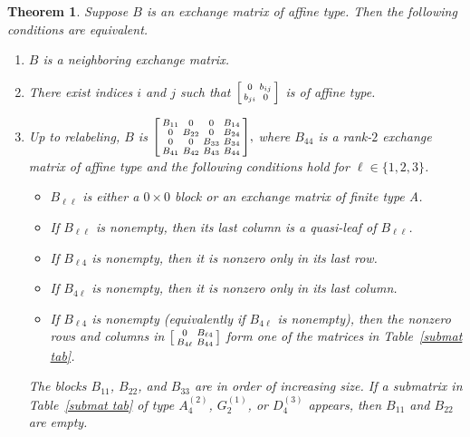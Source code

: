 \documentclass[10pt]{article}
\newtheorem{theorem}[proposition]{Theorem}
\theoremstyle{definition}
\theoremstyle{remark}
\numberwithin{equation}{section}
\newcommand{\set}[1]{{\lbrace #1 \rbrace}}
\newcommand{\0}{{\mathbf{0}}}
\renewcommand{\b}{\mathbf{b}}
\begin{document}
\begin{theorem}\label{neigh B}
Suppose $B$ is an exchange matrix of affine type.
Then the following conditions are equivalent.
\begin{enumerate}[label=\rm(\roman*), ref=(\roman*)]
\item \label{neigh}
$B$ is a neighboring exchange matrix.
\item \label{aff 2}
There exist indices $i$ and $j$ such that $\begin{bsmallmatrix}0&b_{ij}\\b_{ji}&0\end{bsmallmatrix}$ is of affine type.
\item \label{neigh detailed}
Up to relabeling, $B$ is
    $
      \begin{bsmallmatrix}
        B_{11} 	& 0 		& 0 		& B_{14} \\ 
        0 		& B_{22} 	& 0 		& B_{24} \\
        0 		& 0 		& B_{33} 	& B_{34} \\
        B_{41} 	& B_{42} 	& B_{43} 	& B_{44}
      \end{bsmallmatrix},
    $ 
where $B_{44}$ is a rank-$2$ exchange matrix of affine type and the following conditions hold for ${\ell\in\set{1,2,3}}$.
\begin{itemize}
\item
$B_{\ell\ell}$ is either a $0\times0$ block or an exchange matrix of finite type A. %
\item
If $B_{\ell\ell}$ is nonempty, then its last column is a quasi-leaf of $B_{\ell\ell}$.
\item
If $B_{\ell4}$ is nonempty, then it is nonzero only in its last row.
\item
If $B_{4\ell}$ is nonempty, then it is nonzero only in its last column.
\item
If $B_{\ell4}$ is nonempty (equivalently if $B_{4\ell}$ is nonempty), then the nonzero rows and columns in $\begin{bsmallmatrix} 0 & B_{\ell4} \\ B_{4\ell} & B_{44} \end{bsmallmatrix}$ form one of the matrices in Table~\ref{submat tab}.
\end{itemize}
The blocks $B_{11}$, $B_{22}$, and $B_{33}$ are in order of increasing size. 
If a submatrix in Table~\ref{submat tab} of type $A_{4}^{(2)}$, $G_{2}^{(1)}$, or $D_{4}^{(3)}$ appears, then $B_{11}$ and $B_{22}$ are empty.
\end{enumerate}
\end{theorem}
\end{document}
